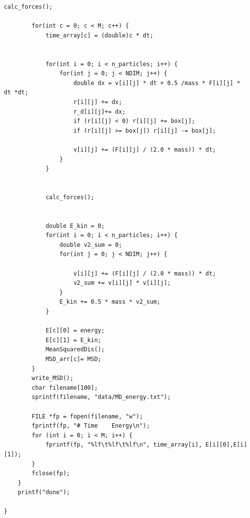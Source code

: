 \begin{lstlisting}[style=Cstyle]
        calc_forces();

        for(int c = 0; c < M; c++) {
            time_array[c] = (double)c * dt;


            for(int i = 0; i < n_particles; i++) {
                for(int j = 0; j < NDIM; j++) {
                    double dx = v[i][j] * dt + 0.5 /mass * F[i][j] * dt *dt;
                    r[i][j] += dx;
                    r_d[i][j]+= dx;
                    if (r[i][j] < 0) r[i][j] += box[j];
                    if (r[i][j] >= box[j]) r[i][j] -= box[j];

                    v[i][j] += (F[i][j] / (2.0 * mass)) * dt;
                }
            }


            calc_forces(); 


            double E_kin = 0;
            for(int i = 0; i < n_particles; i++) {
                double v2_sum = 0;
                for(int j = 0; j < NDIM; j++) {

                    v[i][j] += (F[i][j] / (2.0 * mass)) * dt;
                    v2_sum += v[i][j] * v[i][j];
                }
                E_kin += 0.5 * mass * v2_sum;
            }

            E[c][0] = energy; 
            E[c][1] = E_kin;
            MeanSquaredDis();
            MSD_arr[c]= MSD;
        }
        write_MSD();
        char filename[100];
        sprintf(filename, "data/MD_energy.txt");

        FILE *fp = fopen(filename, "w");
        fprintf(fp, "# Time    Energy\n");
        for (int i = 0; i < M; i++) {
            fprintf(fp, "%lf\t%lf\t%lf\n", time_array[i], E[i][0],E[i][1]);
        }
        fclose(fp);
    }
    printf("done");

}

\end{lstlisting}

